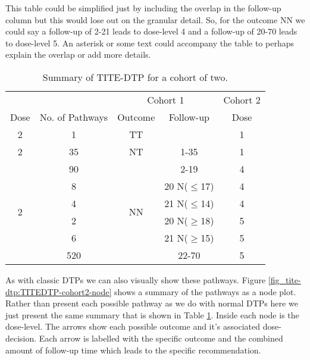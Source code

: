 This table could be simplified just by including the overlap in the follow-up column but this would lose out on the granular detail. So, for the outcome NN we could say a follow-up of 2-21 leads to dose-level 4 and a follow-up of 20-70 leads to dose-level 5. An asterisk or some text could accompany the table to perhaps explain the overlap or add more details. 

\begin{table}[H]
	\centering
	\caption{Summary of TITE-DTP for a cohort of two.}
	\label{tab_tite-dtp:TITEDTP_c2_Sum}
	\begin{tabular}{ccccc}
		\hline
		\multicolumn{1}{l}{} &                 & \multicolumn{2}{c}{Cohort 1}    & Cohort 2 \\ 
		\cmidrule(l{3pt}r{3pt}){3-4} \cmidrule(l{3pt}r{3pt}){5-5}
		Dose                 & No. of Pathways & Outcome             & Follow-up & Dose     \\ \hline
		2                    & 1               & TT                  &           & 1        \\ \hline
		2                    & 35              & NT                  & 1-35      & 1        \\ \hline
		\multirow{6}{*}{2}   & 90              & \multirow{6}{*}{NN} & 2-19      & 4        \\
							 & 8               &                     & 20 N($\leq$17) & 4        \\
							 & 4               &                     & 21 N($\leq$14) & 4        \\
							 & 2               &                     & 20 N($\geq$18) & 5        \\
							 & 6               &                     & 21 N($\geq$15) & 5        \\
							 & 520             &                     & 22-70     & 5        \\ \hline
	\end{tabular}
\end{table}

As with classic DTPs we can also visually show these pathways. Figure \ref{fig_tite-dtp:TITEDTP-cohort2-node} shows a summary of the pathways as a node plot. Rather than present each possible pathway as we do with normal DTPs here we just present the same summary that is shown in Table \ref{tab_tite-dtp:TITEDTP_c2_Sum}. Inside each node is the dose-level. The arrows show each possible outcome and it's associated dose-decision. Each arrow is labelled with the specific outcome and the combined amount of follow-up time  which leads to the specific recommendation. 

